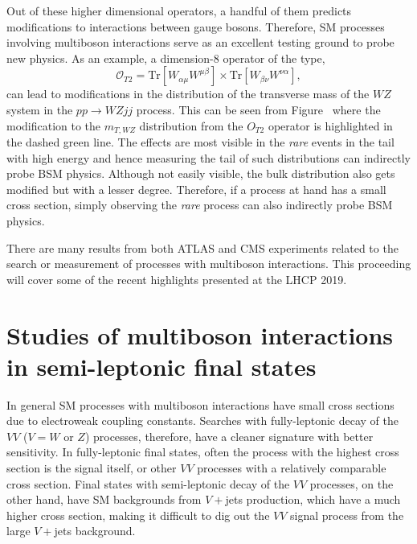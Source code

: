 Out of these higher dimensional operators, a handful of them predicts modifications to interactions between gauge bosons.
Therefore, SM processes involving multiboson interactions serve as an excellent testing ground to probe new physics.
As an example, a dimension-8 operator of the type,
\begin{equation}
    \mathcal{O}_{T2} = \textrm{Tr}\left[W_{\alpha\mu}W^{\mu\beta}\right]\times\textrm{Tr}\left[W_{\beta\nu}W^{\nu\alpha}\right],
\end{equation}
can lead to modifications in the distribution of the transverse mass of the $WZ$ system in the $pp\to WZjj$ process.
This can be seen from Figure~ where the modification to the $m_{T,WZ}$ distribution from the $O_{T2}$ operator is highlighted in the dashed green line.
The effects are most visible in the \emph{rare} events in the tail with high energy and hence measuring the tail of such distributions can indirectly probe BSM physics.
Although not easily visible, the bulk distribution also gets modified but with a lesser degree.
Therefore, if a process at hand has a small cross section, simply observing the \emph{rare} process can also indirectly probe BSM physics.

There are many results from both ATLAS and CMS experiments related to the search or measurement of processes with multiboson interactions.
This proceeding will cover some of the recent highlights presented at the LHCP 2019.

\section{Studies of multiboson interactions in semi-leptonic final states}
\label{sec:diboson}

In general SM processes with multiboson interactions have small cross sections due to electroweak coupling constants.
Searches with fully-leptonic decay of the $VV$ ($V=W$ or $Z$) processes, therefore, have a cleaner signature with better sensitivity.
In fully-leptonic final states, often the process with the highest cross section is the signal itself, or other $VV$ processes with a relatively comparable cross section.
Final states with semi-leptonic decay of the $VV$ processes, on the other hand, have SM backgrounds from $V+$jets production, which have a much higher cross section, making it difficult to dig out the $VV$ signal process from the large $V+$jets background.

